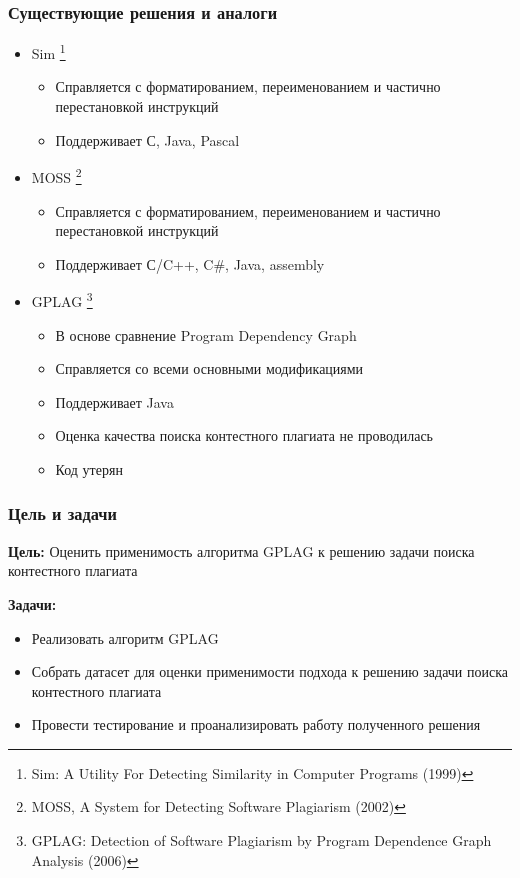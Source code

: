 \documentclass[10pt]{beamer}
\begin{document}
\begin{frame}[fragile]\frametitle{Существующие решения и аналоги}
	\begin{itemize}
		\item Sim \footnote[frame]{Sim: A Utility For Detecting Similarity in Computer Programs (1999)}
		\begin{itemize}
			\item Справляется с форматированием, переименованием и частично перестановкой инструкций
			\item Поддерживает С, Java, Pascal
		\end{itemize}
	    \item MOSS \footnote[frame]{MOSS, A System for Detecting Software Plagiarism (2002)}
	    \begin{itemize}
	    	\item Справляется с форматированием, переименованием и частично перестановкой инструкций
	    	\item Поддерживает С/C++, C#, Java, assembly
	    \end{itemize}
		\item GPLAG \footnote[frame]{GPLAG: Detection of Software Plagiarism by Program Dependence Graph Analysis (2006)}
		\begin{itemize}
			\item В основе сравнение Program Dependency Graph
			\item Справляется со всеми основными модификациями
			\item Поддерживает Java
			\item Оценка качества поиска контестного плагиата не проводилась
			\item Код утерян
		\end{itemize}
	\end{itemize}
\end{frame}

\begin{frame}\frametitle{Цель и задачи}
    \textbf{Цель:} Оценить применимость алгоритма GPLAG к решению задачи поиска контестного плагиата
    
    \textbf{Задачи:}
    \begin{itemize}
        \item Реализовать алгоритм GPLAG
        \item Собрать датасет для оценки применимости подхода к решению задачи поиска контестного плагиата
        \item Провести тестирование и проанализировать работу полученного решения
    \end{itemize}
\end{frame}
\end{document}
